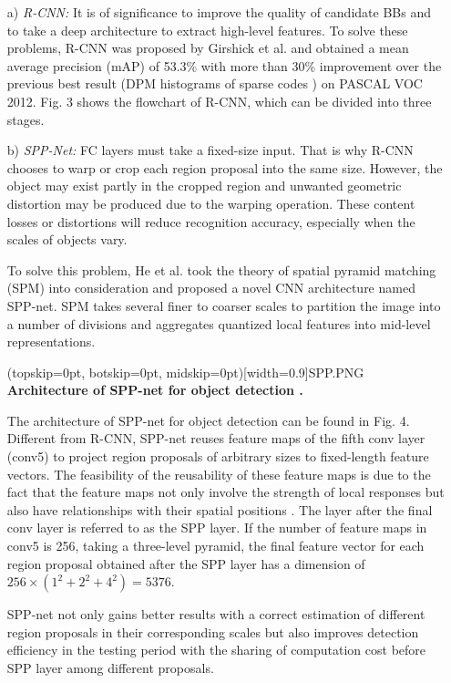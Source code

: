 \documentclass[two column]{ieeeaccess}
\begin{document}
\begin{itemize}
    \item[a)]\textit{R-CNN: }It is of significance to improve the quality of candidate BBs and to take a deep architecture to extract high-level features. To solve these problems, R-CNN was proposed by Girshick et al. \cite{15} and obtained a mean average precision (mAP) of 53.3\% with more than 30\% improvement over the previous best result (DPM histograms of sparse codes \cite{77}) on PASCAL VOC 2012. Fig. 3 shows the flowchart of R-CNN, which can be divided into three stages. \\

     
    \item[b)]\textit{SPP-Net: }
    FC layers must take a fixed-size input. That is why R-CNN chooses to warp or crop each region proposal into the same size. However, the object may exist partly in the cropped region and unwanted geometric distortion may be produced due to the warping operation. These content losses or distortions will reduce recognition accuracy, especially when the scales of objects vary. 
    
    To solve this problem, He et al. \cite{64} took the theory of spatial pyramid matching (SPM) \cite{89,90} into consideration and proposed a novel CNN architecture named SPP-net. SPM takes several finer to coarser scales to partition the image into a number of divisions and aggregates quantized local features into mid-level representations. 
    
    \Figure[ht](topskip=0pt, botskip=0pt, midskip=0pt)[width=0.9\linewidth]{SPP.PNG} {\textbf{Architecture of SPP-net for object detection \cite{64}.}\label{fig4}}
    
    The architecture of SPP-net for object detection can be found in Fig. 4. Different from R-CNN, SPP-net reuses feature maps of the fifth conv layer (conv5) to project region proposals of arbitrary sizes to fixed-length feature vectors. The feasibility of the reusability of these feature maps is due to the fact that the feature maps not only involve the strength of local responses but also have relationships with their spatial positions \cite{64}. The layer after the final conv layer is referred to as the SPP layer. If the number of feature maps in conv5 is 256, taking a three-level pyramid, the final feature vector for each region proposal obtained after the SPP layer has a dimension of $256 \times (1^2 + 2^2 + 4^2) = 5376$. 
    
    SPP-net not only gains better results with a correct estimation of different region proposals in their corresponding scales but also improves detection efficiency in the testing period with the sharing of computation cost before SPP layer among different proposals.\\
    

\end{itemize}
\end{document}
